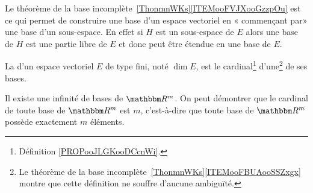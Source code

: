 \begin{remark}      \label{REMooYGJEooEcZQKa}
    Le théorème de la base incomplète~\ref{ThonmnWKs}\ref{ITEMooFVJXooGzzpOu} est ce qui permet de construire une base d'un espace vectoriel en « commençant par» une base d'un sous-espace. En effet si \( H\) est un sous-espace de \( E\) alors une base de \( H\) est une partie libre de \( E\) et donc peut être étendue en une base de \( E\).
\end{remark}

\begin{definition}      \label{DEFooWRLKooArTpgh}
    La  d'un espace vectoriel \( E \) de type fini, noté \(\dim E \), est le cardinal\footnote{Définition \ref{PROPooJLGKooDCcnWi}.} d'une\footnote{Le théorème de la base incomplète~\ref{ThonmnWKs}\ref{ITEMooFBUAooSSZxgx} montre que cette définition ne souffre d'aucune ambiguïté.} de ses bases.
\end{definition}

Il existe une infinité de bases de $\eR^m$. On peut démontrer que le cardinal de toute base de $\eR^m$ est $m$, c'est-à-dire que toute base de $\eR^m$ possède exactement $m$ éléments.

